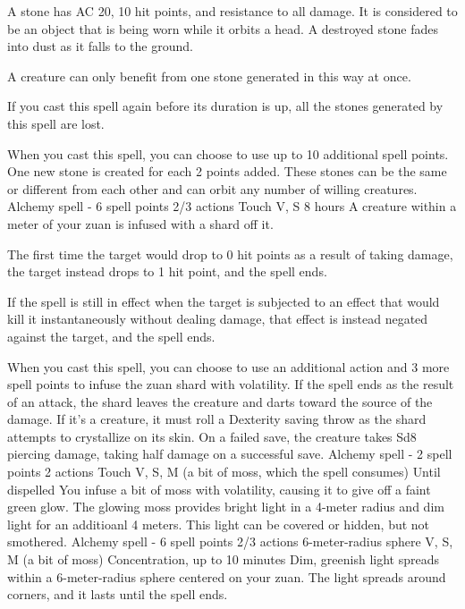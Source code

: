         A stone has AC 20, 10 hit points, and resistance to all damage.
        It is considered to be an object that is being worn while it orbits a head.
        A destroyed stone fades into dust as it falls to the ground.

        A creature can only benefit from one stone generated in this way at once.

        If you cast this spell again before its duration is up, all the stones generated by this spell are lost.

        When you cast this spell, you can choose to use up to 10 additional spell points.
        One new stone is created for each 2 points added.
        These stones can be the same or different from each other and can orbit any number of willing creatures.
        {Alchemy spell - 6 spell points}
        {2/3 actions}
        {Touch}
        {V, S}
        {8 hours}
        A creature within a meter of your zuan is infused with a shard off it.

        The first time the target would drop to 0 hit points as a result of taking damage, the target instead drops to 1 hit point, and the spell ends.

        If the spell is still in effect when the target is subjected to an effect that would kill it instantaneously without dealing damage, that effect is instead negated against the target, and the spell ends.

        When you cast this spell, you can choose to use an additional action and 3 more spell points to infuse the zuan shard with volatility.
        If the spell ends as the result of an attack, the shard leaves the creature and darts toward the source of the damage.
        If it's a creature, it must roll a Dexterity saving throw as the shard attempts to crystallize on its skin.
        On a failed save, the creature takes Sd8 piercing damage, taking half damage on a successful save.
        {Alchemy spell - 2 spell points}
        {2 actions}
        {Touch}
        {V, S, M (a bit of moss, which the spell consumes)}
        {Until dispelled}
        You infuse a bit of moss with volatility, causing it to give off a faint green glow.
        The glowing moss provides bright light in a 4-meter radius and dim light for an additioanl 4 meters.
        This light can be covered or hidden, but not smothered.
        {Alchemy spell - 6 spell points}
        {2/3 actions}
        {6-meter-radius sphere}
        {V, S, M (a bit of moss)}
        {Concentration, up to 10 minutes}
        Dim, greenish light spreads within a 6-meter-radius sphere centered on your zuan.
        The light spreads around corners, and it lasts until the spell ends.

